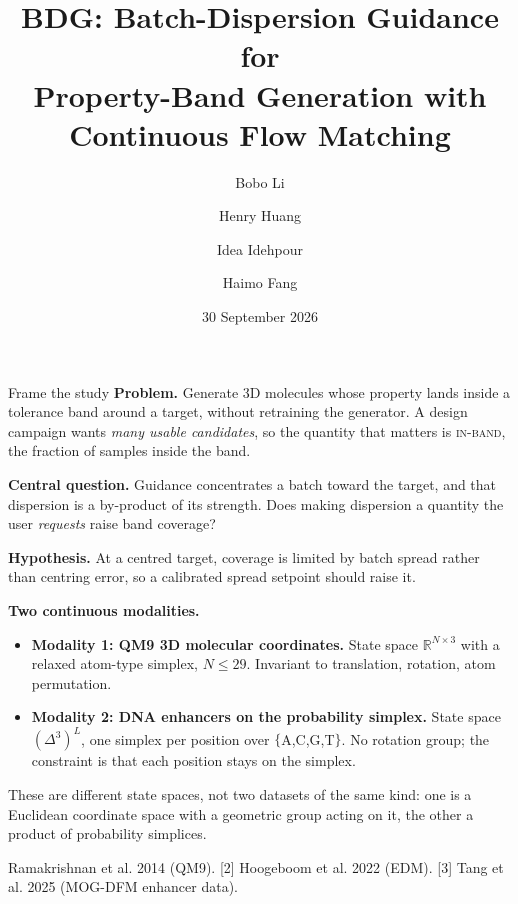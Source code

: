 \documentclass[aspectratio=169,10pt]{beamer}
\title{\bfseries BDG: Batch-Dispersion Guidance for\\Property-Band Generation with Continuous Flow Matching}
\author{Bobo Li \and Henry Huang \and Idea Idehpour \and Haimo Fang}
\institute{CIS 6270, Group 2 \\ Department of Computer and Information Science, University of Pennsylvania}
\date{30 September 2026}
\newcommand{\theslidelabel}{}
\newcommand{\lbl}[1]{\renewcommand{\theslidelabel}{#1}}
\newcommand{\srcs}[1]{\vfill{\raggedleft\color{grayt}\fontsize{4.9}{5.6}\selectfont #1\par}}
\newcommand{\ib}{\textsc{in-band}}
\newcommand{\take}[1]{\vspace{0.4ex}\colorbox{black!6}{\parbox{0.97\linewidth}{\footnotesize #1}}}
\begin{document}
{\lbl{}
\begin{frame}[plain]
  \titlepage
\end{frame}}

\lbl{1a}
\begin{frame}{Frame the study}
  \textbf{Problem.} Generate 3D molecules whose property lands inside a tolerance
  band around a target, without retraining the generator. A design campaign wants
  \emph{many usable candidates}, so the quantity that matters is \ib, the fraction of
  samples inside the band.

  \medskip
  \textbf{Central question.} Guidance concentrates a batch toward the target, and
  that dispersion is a by-product of its strength. Does making dispersion a quantity
  the user \emph{requests} raise band coverage?

  \medskip
  \textbf{Hypothesis.} At a centred target, coverage is limited by batch spread
  rather than centring error, so a calibrated spread setpoint should raise it.

  \medskip
  \textbf{Two continuous modalities.}
  \begin{itemize}\setlength\itemsep{0.15em}
    \item \textbf{Modality 1: QM9 3D molecular coordinates.} State space
      $\mathbb{R}^{N\times3}$ with a relaxed atom-type simplex, $N\le29$. Invariant
      to translation, rotation, atom permutation.
    \item \textbf{Modality 2: DNA enhancers on the probability simplex.} State space
      $(\Delta^3)^L$, one simplex per position over $\{$A,C,G,T$\}$. No rotation
      group; the constraint is that each position stays on the simplex.
  \end{itemize}

  \take{These are different state spaces, not two datasets of the same kind: one is
  a Euclidean coordinate space with a geometric group acting on it, the other a
  product of probability simplices.}

  \srcs{[1] Ramakrishnan et al. 2014 (QM9). [2] Hoogeboom et al. 2022 (EDM).
        [3] Tang et al. 2025 (MOG-DFM enhancer data).}
\end{frame}
\end{document}
